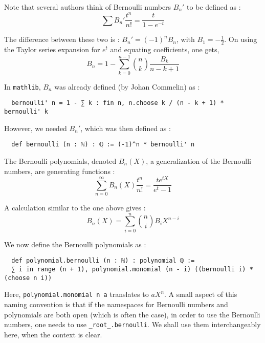 \documentclass[a4paper,UKenglish,cleveref, autoref, thm-restate]{lipics-v2021}
\newcommand{\lean}[1]{\texttt{#1}\xspace} %
\begin{document}
Note that several authors think of Bernoulli numbers $B_n'$ to be defined as :
$$\sum B_n'\frac{t^n}{n!}=\frac{t}{1-e^{-t}}$$

The difference between these two is : $B_n' = (-1)^n B_n$, with $B_1 = - \frac{1}{2}$.
On using the Taylor series expansion for $e^t$ and equating coefficients, one gets,
$$ B_n = 1 - \sum_{k = 0}^{n - 1} {n \choose k} \frac{B_k}{n - k + 1} $$

In \lean{mathlib}, $B_n$ was already defined (by Johan Commelin) as :
\begin{lstlisting}
  bernoulli' n = 1 - ∑ k : fin n, n.choose k / (n - k + 1) * bernoulli' k
\end{lstlisting}
However, we needed $B_n'$, which was then defined as :
\begin{lstlisting}
  def bernoulli (n : ℕ) : ℚ := (-1)^n * bernoulli' n
\end{lstlisting}

The Bernoulli polynomials, denoted $B_n(X)$, a generalization of the Bernoulli numbers,
are generating functions :
$$ \sum_{n = 0}^{\infty} B_n(X) \frac{t^n}{n!} = \frac{t e^{tX}}{e^t - 1} $$

A calculation similar to the one above gives :
$$ B_n (X) = \sum_{i = 0}^n {n \choose i} B_i X^{n - i} $$

We now define the Bernoulli polynomials as :
\begin{lstlisting}
  def polynomial.bernoulli (n : ℕ) : polynomial ℚ :=
  ∑ i in range (n + 1), polynomial.monomial (n - i) ((bernoulli i) * (choose n i))
\end{lstlisting}

Here, \lean{polynomial.monomial n a} translates to $a X^n$. A small aspect of this 
naming convention is that if the namespaces for Bernoulli numbers and polynomials are both open 
(which is often the case), in order to use the Bernoulli numbers, one needs to use \lean{\_root\_.bernoulli}. 
We shall use them interchangeably here, when the context is clear. 
\end{document}
